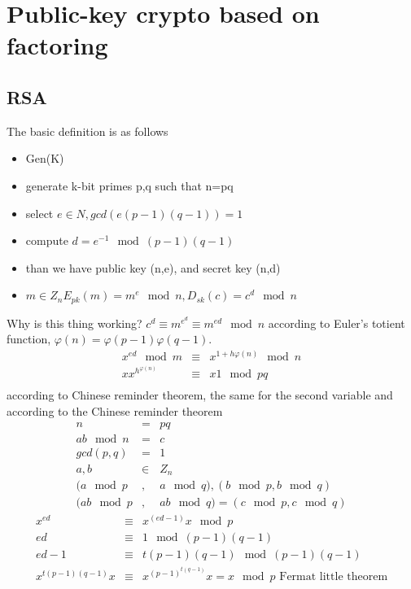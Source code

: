 \documentclass[a4paper,10pt]{article}
\begin{document}
\section*{Public-key crypto based on factoring}
\subsection*{RSA}
The basic definition is as follows
\begin{itemize}
\item Gen(K)
\item generate k-bit primes p,q such that n=pq
\item select $e \in N, gcd(e(p-1)(q-1))=1$
\item compute $d = e^{-1} \mod (p-1)(q-1)$
\item than we have public key (n,e), and secret key (n,d)
\item $m \in Z_n E_{pk}(m) = m^e \mod n, D_{sk}(c) = c^d \mod n$
\end{itemize}
Why is this thing working? $c^d \equiv m^{e^d} \equiv m^{ed} \mod n$  according to Euler's totient function, $\varphi(n) = \varphi(p-1)\varphi(q-1)$.
\begin{eqnarray*}
x^{ed} \mod m &\equiv & x^{1 + h\varphi(n)} \mod n\\
x x^{h^{\varphi(n)}} & \equiv & x1 \mod pq\\
\end{eqnarray*}
according to Chinese reminder theorem, the same for the second variable and according to the Chinese reminder theorem 
\begin{eqnarray*}
n &=& pq\\
ab \mod n &=& c\\
gcd(p,q) &=& 1\\
a,b &\in & Z_n\\
(a \mod p&,&a \mod q),(b \mod p,b \mod q)\\
(ab \mod p&,&ab \mod q) = (c \mod p, c \mod q)
\end{eqnarray*}
\begin{eqnarray*}
x^{ed} & \equiv & x^{(ed-1)}x \mod p\\
ed &\equiv & 1 \mod(p-1)(q-1)\\
ed - 1 &\equiv & t(p-1)(q-1) \mod (p-1)(q-1)\\
x^{t(p-1)(q-1)}x & \equiv &  x^{(p-1)^{t(q-1)}}x = x\mod p \text{ Fermat little theorem}\\
\end{eqnarray*}
\end{document}
